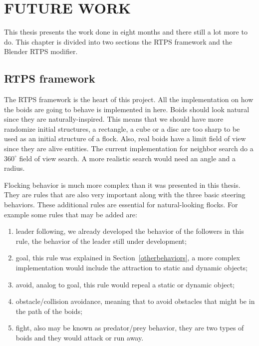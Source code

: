 \chapter{FUTURE WORK}

This thesis presents the work done in eight months and there still a lot more to do. This chapter is  divided into two sections the RTPS framework and the Blender RTPS modifier.

\section{RTPS framework}

The RTPS framework is the heart of this project. All the implementation on how the boids are going to behave is implemented in here. Boids should look natural since they are naturally-inspired. This means that we should have more randomize initial structures, a rectangle, a cube or a disc are too sharp to be used as an initial structure of a flock. Also, real boids have a limit field of view since they are alive entities. The current implementation for neighbor search do a $360^{\circ}$ field of view search. A more realistic search would need an angle and a radius.

Flocking behavior is much more complex than it was presented in this thesis. They are rules that are also very important along with the three basic steering behaviors. These additional rules are essential for natural-looking flocks. For example some rules that may be added are: 

\begin{enumerate}
\item{leader following, we already developed the behavior of the followers in this rule, the behavior of the leader still under development;}
\item{goal, this rule was explained in Section~\ref{otherbehaviors}, a more complex implementation would include the attraction to static and dynamic objects;}
\item{avoid, analog to goal, this rule would repeal a static or dynamic object;} 
\item{obstacle/collision avoidance, meaning that to avoid obstacles that might be in the path of the boids;}
\item{fight, also may be known as predator/prey behavior, they are two types of boids and they would attack or run away.}
\end{enumerate}

